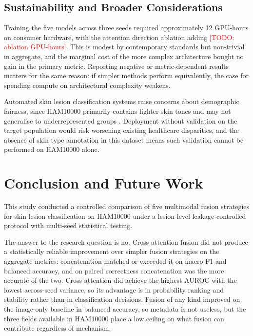 \documentclass[conference]{IEEEtran}
\newcommand{\TODO}[1]{\textcolor{red}{[TODO: #1]}}
\begin{document}
\subsection{Sustainability and Broader Considerations}

Training the five models across three seeds required approximately 12 GPU-hours on consumer hardware, with the attention direction ablation adding \TODO{ablation GPU-hours}. This is modest by contemporary standards but non-trivial in aggregate, and the marginal cost of the more complex architecture bought no gain in the primary metric. Reporting negative or metric-dependent results matters for the same reason: if simpler methods perform equivalently, the case for spending compute on architectural complexity weakens.

Automated skin lesion classification systems raise concerns about demographic fairness, since HAM10000 primarily contains lighter skin tones and may not generalise to underrepresented groups \citep{wang2024skin}. Deployment without validation on the target population would risk worsening existing healthcare disparities, and the absence of skin type annotation in this dataset means such validation cannot be performed on HAM10000 alone.

\section{Conclusion and Future Work}
\label{sec:conclusion}

This study conducted a controlled comparison of five multimodal fusion strategies for skin lesion classification on HAM10000 under a lesion-level leakage-controlled protocol with multi-seed statistical testing.

The answer to the research question is no. Cross-attention fusion did not produce a statistically reliable improvement over simpler fusion strategies on the aggregate metrics: concatenation matched or exceeded it on macro-F1 and balanced accuracy, and on paired correctness concatenation was the more accurate of the two. Cross-attention did achieve the highest AUROC with the lowest across-seed variance, so its advantage is in probability ranking and stability rather than in classification decisions. Fusion of any kind improved on the image-only baseline in balanced accuracy, so metadata is not useless, but the three fields available in HAM10000 place a low ceiling on what fusion can contribute regardless of mechanism.
\end{document}
